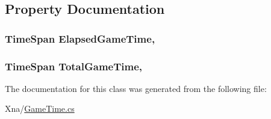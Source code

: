 \subsection{Property Documentation}
\hypertarget{classMicrosoft_1_1Xna_1_1Framework_1_1GameTime_a48649cb1cbc29f9ddd6c0e78af6baa85}{}
\subsubsection[{Elapsed\+Game\+Time}]{\setlength{\rightskip}{0pt plus 5cm}Time\+Span Elapsed\+Game\+Time\hspace{0.3cm}{\ttfamily [get]}, {\ttfamily [set]}}\label{classMicrosoft_1_1Xna_1_1Framework_1_1GameTime_a48649cb1cbc29f9ddd6c0e78af6baa85}
\hypertarget{classMicrosoft_1_1Xna_1_1Framework_1_1GameTime_a2b56900aacbf4b1927bddf6fe83f9e21}{}
\subsubsection[{Total\+Game\+Time}]{\setlength{\rightskip}{0pt plus 5cm}Time\+Span Total\+Game\+Time\hspace{0.3cm}{\ttfamily [get]}, {\ttfamily [set]}}\label{classMicrosoft_1_1Xna_1_1Framework_1_1GameTime_a2b56900aacbf4b1927bddf6fe83f9e21}


The documentation for this class was generated from the following file\+:\begin{DoxyCompactItemize}
\item 
Xna/\hyperlink{GameTime_8cs}{Game\+Time.\+cs}\end{DoxyCompactItemize}
